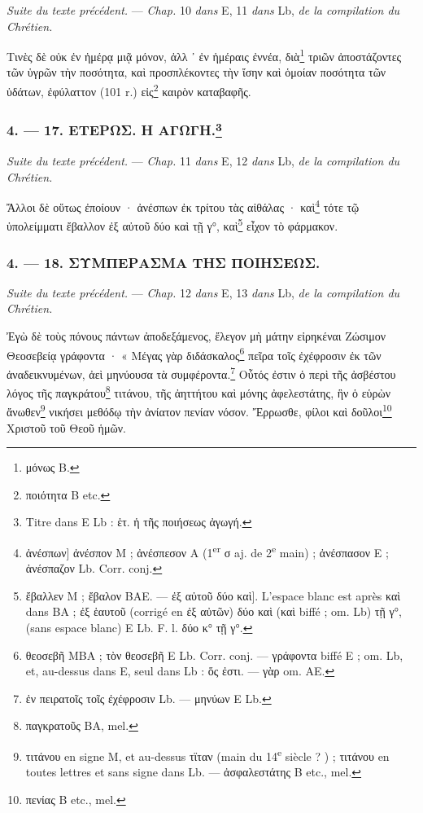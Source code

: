 \documentclass[a4paper, 11pt, oneside, polutonikogreek, french]{article}
\begin{document}
\emph{Suite du texte précédent.} --- \emph{Chap.} 10 \emph{dans} E, 11 \emph{dans} Lb, \emph{de la compilation du Chrétien.}

\bigskip

Τινὲς δὲ οὐκ ἐν ἡμέρᾳ μιᾷ μόνον, ἀλλ ᾽ ἐν ἡμέραις ἐννέα, διὰ\footnote{μόνως B.} τριῶν ἀποστάζοντες τῶν ὑγρῶν τὴν ποσότητα, καὶ προσπλέκοντες τὴν ἴσην καὶ ὁμοίαν ποσότητα τῶν ὑδάτων, ἐφύλαττον (101 r.) εἰς\footnote{ποιότητα B etc.} καιρὸν καταβαφῆς.

\bigskip
\centerline{\EightStarTaper}
\centerline{\EightStarTaper\EightStarTaper}
\bigskip

\subsubsection[4. --- 17. ΕΤΕΡΩΣ. Η ΑΓΩΓΗ.]{4. --- 17. ΕΤΕΡΩΣ. Η ΑΓΩΓΗ.\footnote{Titre dans E Lb : ἑτ. ἡ τῆς ποιήσεως ἀγωγή.}}

\emph{Suite du texte précédent.} --- \emph{Chap.} 11 \emph{dans} E, 12 \emph{dans} Lb, \emph{de la compilation du Chrétien.}

\bigskip

Ἄλλοι δὲ οὕτως ἐποίουν · ἀνέσπων ἐκ τρίτου τὰς αἰθάλας · καὶ\footnote{ἀνέσπων] ἀνέσπον M ; ἀνέσπεσον A (1\textsuperscript{er} σ aj. de 2\textsuperscript{e} main) ; ἀνέσπασον E ; ἀνέσπαζον Lb. Corr. conj.} τότε τῷ ὑπολείμματι ἔβαλλον ἐξ αὐτοῦ δύο    καὶ τῇ γ°, καὶ\footnote{ἔβαλλεν M ; ἔβαλον BAE. --- ἐξ αὐτοῦ δύο    καὶ]. L'espace blanc est après καὶ dans BA ; ἐξ ἑαυτοῦ (corrigé en ἐξ αὐτῶν) δύο καὶ (καὶ biffé ; om. Lb) τῇ γ°, (sans espace blanc) E Lb. F. l. δύο κ° τῇ γ°.} εἶχον τὸ φάρμακον.

\bigskip
\centerline{\EightStarTaper}
\centerline{\EightStarTaper\EightStarTaper}
\bigskip

\subsubsection{4. --- 18. ΣΥΜΠΕΡΑΣΜΑ ΤΗΣ ΠΟΙΗΣΕΩΣ.}

\emph{Suite du texte précédent.} --- \emph{Chap.} 12 \emph{dans} E, 13 \emph{dans} Lb, \emph{de la compilation du Chrétien.}

\bigskip

Ἐγὼ δὲ τοὺς πόνους πάντων ἀποδεξάμενος, ἔλεγον μὴ μάτην εἰρηκέναι Ζώσιμον Θεοσεβείᾳ γράφοντα · « Μέγας γὰρ διδάσκαλος\footnote{θεοσεβῆ MBA ; τὸν θεοσεβῆ E Lb. Corr. conj. --- γράφοντα biffé E ; om. Lb, et, au-dessus dans E, seul dans Lb : ὅς ἐστι. --- γὰρ om. AE.} πεῖρα τοῖς ἐχέφροσιν ἐκ τῶν ἀναδεικνυμένων, ἀεὶ μηνύουσα τὰ συμφέροντα.\footnote{ἐν πειρατοῖς τοῖς ἐχέφροσιν Lb. --- μηνύων E Lb.} Οὗτός ἐστιν ὁ περὶ τῆς ἀσβέστου λόγος τῆς παγκράτου\footnote{παγκρατοῦς BA, mel.} τιτάνου, τῆς ἀηττήτου καὶ μόνης ἀφελεστάτης, ἣν ὁ εὑρὼν ἄνωθεν\footnote{τιτάνου en signe M, et au-dessus τϊταν (main du 14\textsuperscript{e} siècle ? ) ; τιτάνου en toutes lettres et sans signe dans Lb. --- ἀσφαλεστάτης B etc., mel.} νικήσει μεθόδῳ τὴν ἀνίατον πενίαν νόσον. Ἔρρωσθε, φίλοι καὶ δοῦλοι\footnote{πενίας B etc., mel.} Χριστοῦ τοῦ Θεοῦ ἡμῶν.
\end{document}
